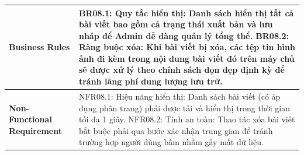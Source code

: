 \documentclass[a4paper,12pt]{article}
\begin{document}
\begin{longtable}{|p{4cm}|p{11.5cm}|}
\textbf{Business Rules} & 
BR08.1: Quy tắc hiển thị: Danh sách hiển thị tất cả bài viết bao gồm cả trạng thái xuất bản và lưu nháp để Admin dễ dàng quản lý tổng thể. \newline
BR08.2: Ràng buộc xóa: Khi bài viết bị xóa, các tệp tin hình ảnh đi kèm trong nội dung bài viết đó trên máy chủ sẽ được xử lý theo chính sách dọn dẹp định kỳ để tránh lãng phí dung lượng lưu trữ. \\ \hline
\textbf{Non-Functional Requirement} & 
NFR08.1: Hiệu năng hiển thị: Danh sách bài viết (có áp dụng phân trang) phải được tải và hiển thị trong thời gian tối đa 1 giây. \newline
NFR08.2: Tính an toàn: Thao tác xóa bài viết bắt buộc phải qua bước xác nhận trung gian để tránh trường hợp người dùng bấm nhầm gây mất dữ liệu. \\ \hline
\end{longtable}
\end{document}
